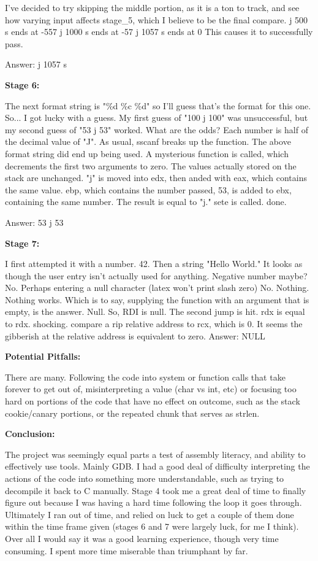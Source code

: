 \documentclass{article}
\begin{document}
    I've decided to try skipping the middle portion, as it is a ton to track, and see how varying input affects stage\_5, which I believe to be the final compare.
    j 500 s ends at -557
    j 1000 s ends at -57
    j 1057 s ends at 0
    This causes it to successfully pass.

    Answer: j 1057 s


    \textbf{Stage 6:}

    \bigskip

    The next format string is "\%d \%c \%d" so I'll guess that's the format for this one.
    So... I got lucky with a guess.
    My first guess of "100 j 100" was unsuccessful, but my second guess of "53 j 53" worked. What are the odds?
    Each number is half of the decimal value of "J".
    As usual, sscanf breaks up the function. The above format string did end up being used.
    A mysterious function is called, which decrements the first two arguments to zero. The values actually stored on the stack are unchanged.
    "j" is moved into edx, then anded with eax, which contains the same value.
    ebp, which contains the number passed, 53, is added to ebx, containing the same number. The result is equal to "j." 
    sete is called.
    done.

    Answer: 53 j 53

    \bigskip

    \textbf{Stage 7:}

    \bigskip

        I first attempted it with a number. 42. Then a string "Hello World."
It looks as though the user entry isn't actually used for anything.
Negative number maybe? No.
Perhaps entering a null character (latex won't print slash zero) No.
Nothing. Nothing works. Which is to say, supplying the function with an argument that is empty, is the answer. Null.
So, RDI is null.
The second jump is hit. rdx is equal to rdx. shocking.
compare a rip relative address to rcx, which is 0.
It seems the gibberish at the relative address is equivalent to zero.
Answer: NULL

    \bigskip


    \textbf{Potential Pitfalls:}

    There are many. Following the code into system or function calls that take forever to get out of, misinterpreting a value (char vs int, etc) or focusing too hard on portions of the code that have no effect on outcome, such as the stack cookie/canary portions, or the repeated chunk that serves as strlen.


    \textbf{Conclusion:}

    The project was seemingly equal parts a test of assembly literacy, and ability to effectively use tools. Mainly GDB. I had a good deal of difficulty interpreting the actions of the code into something more understandable, such as trying to decompile it back to C manually. Stage 4 took me a great deal of time to finally figure out because I was having a hard time following the loop it goes through. Ultimately I ran out of time, and relied on luck to get a couple of them done within the time frame given (stages 6 and 7 were largely luck, for me I think).
    Over all I would say it was a good learning experience, though very time consuming. I spent more time miserable than triumphant by far.
\end{document}
